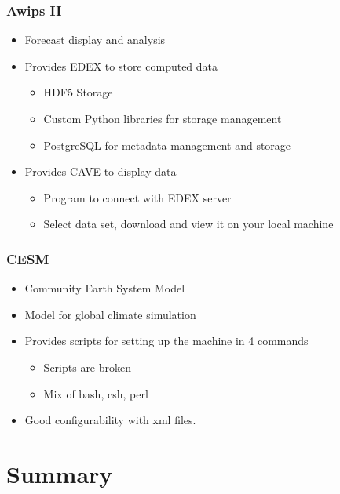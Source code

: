 \documentclass[compress]{beamer}
\begin{document}
\begin{frame}
    \frametitle{Awips II}
    	\begin{itemize}
			\item Forecast display and analysis
			\item Provides EDEX to store computed data
	    	\begin{itemize}
		    	\item HDF5 Storage
		    	\item Custom Python libraries for storage management
		    	\item PostgreSQL for metadata management and storage
		    \end{itemize}
		    \item Provides CAVE to display data
	    	\begin{itemize}
		    	\item Program to connect with EDEX server
		    	\item Select data set, download and view it on your local machine
		    \end{itemize}
		\end{itemize}
\end{frame}


\begin{frame}
    \frametitle{CESM}
    	\begin{itemize}
    	    \item Community Earth System Model
			\item Model for global climate simulation
			\item Provides scripts for setting up the machine in 4 commands
	    	\begin{itemize}
		    	\item Scripts are broken
		    	\item Mix of bash, csh, perl
		    \end{itemize}
		    \item Good configurability with xml files.
		\end{itemize}
\end{frame}


\section{Summary}
\subsection*{}
\end{document}
